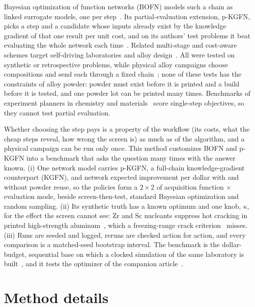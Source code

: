 \documentclass[11pt]{article}
\begin{document}
Bayesian optimization of function networks (BOFN) models such a chain as linked
surrogate models, one per step~\cite{astudillo2021}. Its partial-evaluation
extension, p-KGFN, picks a step and a candidate whose inputs already exist by
the knowledge gradient of that one result per unit cost, and on its authors'
test problems it beat evaluating the whole network each
time~\cite{buathong2024,buathong2025}. Related multi-stage and cost-aware
schemes target self-driving laboratories and alloy
design~\cite{torresi2026,alvi2026}. All were tested on synthetic or
retrospective problems, while physical alloy campaigns choose compositions and
send each through a fixed chain~\cite{taherimousavi2026}; none of these tests has
the constraints of alloy powder: powder must
exist before it is printed and a build before it is tested, and one powder lot
can be printed many times. Benchmarks of experiment planners in chemistry and
materials~\cite{hase2021,felton2021,liang2021} score single-step objectives, so
they cannot test partial evaluation.

Whether choosing the step pays is a property of the workflow (its costs, what
the cheap steps reveal, how wrong the screen is) as much as of the algorithm,
and a physical campaign can be run only once. This method customizes BOFN and
p-KGFN into a benchmark that asks the question many times with the answer known.
(i) One network model carries p-KGFN, a full-chain knowledge-gradient
counterpart (KGFN), and network expected improvement per dollar with and without
powder reuse, so the policies form a $2\times2$ of acquisition function $\times$
evaluation mode, beside screen-then-test, standard Bayesian optimization and
random sampling. (ii) Its synthetic truth has a known optimum and one knob,
$\kappa$, for the effect the screen cannot see: Zr and Sc nucleants suppress hot
cracking in printed high-strength aluminum~\cite{martin2017}, which a
freezing-range crack criterion~\cite{kou2015} misses. (iii) Runs are seeded and
logged, reruns are checked action for action, and every comparison is a
matched-seed bootstrap interval. The benchmark is the dollar-budget, sequential
base on which a clocked simulation of the same laboratory is
built~, and it tests the optimizer of the companion
article~.

\section*{Method details}
\end{document}
